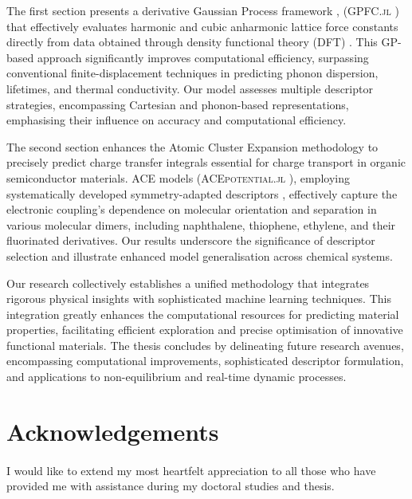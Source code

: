 The first section presents a derivative Gaussian Process framework \cite{Solak2002,mchutchon_dierentiating_2013, GarijodelRo2019, Kaappa2021, Deringer2021}, (\textsc{GPFC.jl} \cite{https://doi.org/10.48550/arxiv.2405.05113,GitHub}) that effectively evaluates harmonic and cubic anharmonic lattice force constants directly from data obtained through density functional theory (DFT) \cite{Togo2015,Togo2015-qf,Phonopy_toolkit,phonopy}.  This GP-based approach significantly improves computational efficiency, surpassing conventional finite-displacement techniques in predicting phonon dispersion, lifetimes, and thermal conductivity. Our model assesses multiple descriptor strategies, encompassing Cartesian and phonon-based representations, emphasising their influence on accuracy and computational efficiency.

The second section enhances the Atomic Cluster Expansion methodology \cite{Drautz2019} to precisely predict charge transfer integrals essential for charge transport in organic semiconductor materials.  ACE models (\textsc{ACEpotential.jl} \cite{Witt2023}), employing systematically developed symmetry-adapted descriptors \cite{Dusson2022}, effectively capture the electronic coupling's dependence on molecular orientation and separation in various molecular dimers, including naphthalene, thiophene, ethylene, and their fluorinated derivatives.  Our results underscore the significance of descriptor selection and illustrate enhanced model generalisation across chemical systems.

 Our research collectively establishes a unified methodology that integrates rigorous physical insights with sophisticated machine learning techniques.  This integration greatly enhances the computational resources for predicting material properties, facilitating efficient exploration and precise optimisation of innovative functional materials. The thesis concludes by delineating future research avenues, encompassing computational improvements, sophisticated descriptor formulation, and applications to non-equilibrium and real-time dynamic processes.
\newpage
\thispagestyle{plain}
\section*{\Huge Acknowledgements}
\paragraph{}
I would like to extend my most heartfelt appreciation to all those who have provided me with assistance during my doctoral studies and thesis.
 
